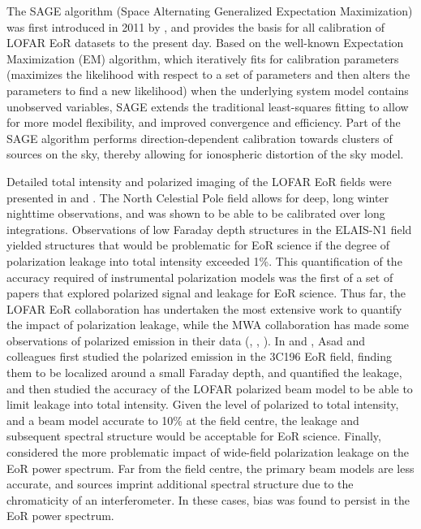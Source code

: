The SAGE algorithm (Space Alternating Generalized Expectation Maximization) was first introduced in 2011 by \cite{2011MNRAS.414.1656K}, and provides the basis for all calibration of LOFAR EoR datasets to the present day. Based on the well-known Expectation Maximization (EM) algorithm, which iteratively fits for calibration parameters (maximizes the likelihood with respect to a set of parameters and then alters the parameters to find a new likelihood) when the underlying system model contains unobserved variables, SAGE extends the traditional least-squares fitting to allow for more model flexibility, and improved convergence and efficiency. Part of the SAGE algorithm performs direction-dependent calibration towards clusters of sources on the sky, thereby allowing for ionospheric distortion of the sky model.

Detailed total intensity and polarized imaging of the LOFAR EoR fields were presented in \cite{2013A&A...550A.136Y} and \cite{2014A&A...568A.101J}. The North Celestial Pole field allows for deep, long winter nighttime observations, and was shown to be able to be calibrated over long integrations. Observations of low Faraday depth structures in the ELAIS-N1 field yielded structures that would be problematic for EoR science if the degree of polarization leakage into total intensity exceeded 1\%. This quantification of the accuracy required of instrumental polarization models was the first of a set of papers that explored polarized signal and leakage for EoR science. Thus far, the LOFAR EoR collaboration has undertaken the most extensive work to quantify the impact of polarization leakage, while the MWA collaboration has made some observations of polarized emission in their data (\cite{2016ApJ...830...38L}, \cite{2017PASA...34...40L}, \cite{2013ApJ...771..105B}). In \cite{2015MNRAS.451.3709A} and \cite{2016MNRAS.462.4482A}, Asad and colleagues first studied the polarized emission in the 3C196 EoR field, finding them to be localized around a small Faraday depth, and quantified the leakage, and then studied the accuracy of the LOFAR polarized beam model to be able to limit leakage into total intensity. Given the level of polarized to total intensity, and a beam model accurate to 10\% at the field centre, the leakage and subsequent spectral structure would be acceptable for EoR science. Finally, \cite{2018MNRAS.476.3051A} considered the more problematic impact of wide-field polarization leakage on the EoR power spectrum. Far from the field centre, the primary beam models are less accurate, and sources imprint additional spectral structure due to the chromaticity of an interferometer. In these cases, bias was found to persist in the EoR power spectrum.

